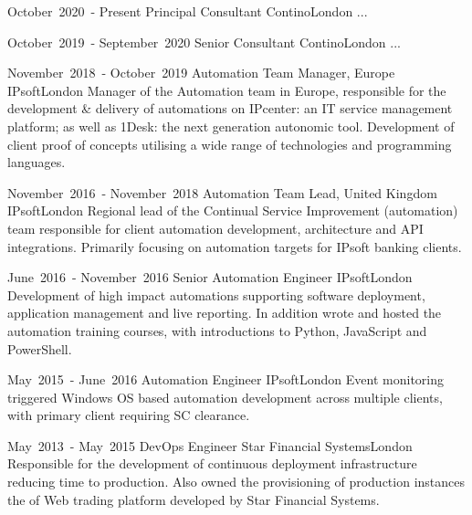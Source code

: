 
\cventry %
  {\mbox{October 2020 -} \mbox{Present}}
  {Principal Consultant}
  {Contino}{London}{}
  { 
    ...
  }

\cventry %
  {\mbox{October 2019 -} \mbox{September 2020}}
  {Senior Consultant}
  {Contino}{London}{}
  {
    ...  
  }

\cventry %
  {\mbox{November 2018 -} \mbox{October 2019}}
  {Automation Team Manager, Europe}
  {IPsoft}{London}{}
  {
    Manager of the Automation team in Europe, responsible for the 
    development \& delivery of automations on IPcenter: an IT service management 
    platform; as well as 1Desk: the next generation autonomic tool. 
    Development of client proof of concepts utilising a wide range of technologies and programming languages.\\
  }

\cventry %
  {\mbox{November 2016 -} \mbox{November 2018}}
  {Automation Team Lead, United Kingdom}
  {IPsoft}{London}{}
  {
    Regional lead of the Continual Service Improvement (automation) team responsible 
    for client automation development, architecture and API integrations. 
    Primarily focusing on automation targets for IPsoft banking clients.\\
  }

\cventry %
  {\mbox{June 2016 -} \mbox{November 2016}}
  {Senior Automation Engineer}
  {IPsoft}{London}{}
  {
    Development of high impact automations supporting software deployment, 
    application management and live reporting. In addition wrote and hosted 
    the automation training courses, with introductions to Python, JavaScript and PowerShell.\\
  }

\cventry %
  {\mbox{May 2015 -} \mbox{June 2016}}
  {Automation Engineer}
  {IPsoft}{London}{}
  {
    Event monitoring triggered Windows OS based automation development across 
    multiple clients, with primary client requiring SC clearance.\\
  }

\cventry %
  {\mbox{May 2013 -} \mbox{May 2015}}
  {DevOps Engineer}
  {Star Financial Systems}{London}{}
  {
    Responsible for the development of continuous deployment infrastructure 
    reducing time to production. Also owned the provisioning of production 
    instances the of Web trading platform developed by Star Financial Systems.\\
  }

